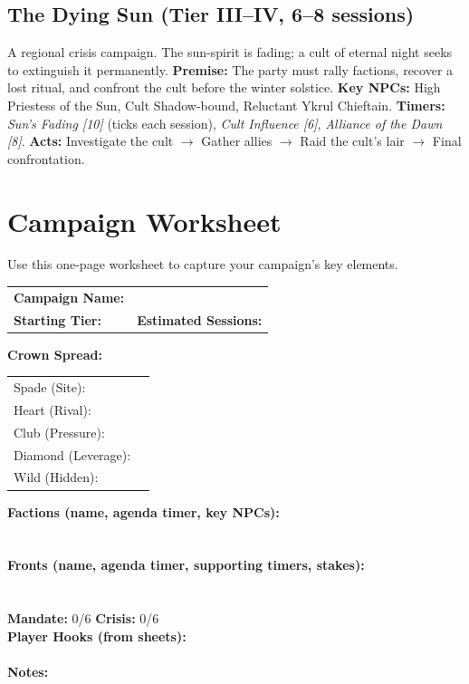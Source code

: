 \subsection{The Dying Sun (Tier III--IV, 6--8 sessions)}
A regional crisis campaign. The sun-spirit is fading; a cult of eternal night seeks to extinguish it permanently.  
\textbf{Premise:} The party must rally factions, recover a lost ritual, and confront the cult before the winter solstice.  
\textbf{Key NPCs:} High Priestess of the Sun, Cult Shadow-bound, Reluctant Ykrul Chieftain.  
\textbf{Timers:} \emph{Sun's Fading [10]} (ticks each session), \emph{Cult Influence [6]}, \emph{Alliance of the Dawn [8]}.  
\textbf{Acts:} Investigate the cult $\rightarrow$ Gather allies $\rightarrow$ Raid the cult's lair $\rightarrow$ Final confrontation.

\section{Campaign Worksheet}
\label{sec:worksheet}

Use this one-page worksheet to capture your campaign's key elements.

\begin{tcolorbox}[colback=white!97!gray, colframe=black!80!gray, title=Campaign Worksheet,breakable]
\begin{tabular}{p{4cm}p{10cm}}
\textbf{Campaign Name:} & \hrulefill \\
\textbf{Starting Tier:} & \hrulefill \quad \textbf{Estimated Sessions:} \hrulefill \\
\end{tabular}
\vspace{2mm}
\textbf{Crown Spread:} \\
\begin{tabular}{ll}
Spade (Site): & \hrulefill \\
Heart (Rival): & \hrulefill \\
Club (Pressure): & \hrulefill \\
Diamond (Leverage): & \hrulefill \\
Wild (Hidden): & \hrulefill \\
\end{tabular}
\vspace{2mm}
\textbf{Factions (name, agenda timer, key NPCs):} \\
\hrulefill \\
\hrulefill \\
\vspace{2mm}
\textbf{Fronts (name, agenda timer, supporting timers, stakes):} \\
\hrulefill \\
\hrulefill \\
\vspace{2mm}
\textbf{Mandate:} 0/6 \quad \textbf{Crisis:} 0/6 \\
\vspace{2mm}
\textbf{Player Hooks (from sheets):} \\
\hrulefill \\
\vspace{2mm}
\textbf{Notes:} \hrulefill
\end{tcolorbox}

